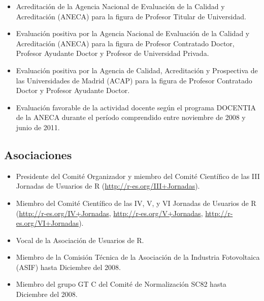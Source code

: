 \documentclass[article, a4paper]{memoir}
\begin{document}
\begin{itemize}
\item Acreditación de la Agencia Nacional de Evaluación de la Calidad y Acreditación (ANECA) para la figura de Profesor Titular de Universidad.

\item Evaluación positiva por la Agencia Nacional de Evaluación de la Calidad y Acreditación (ANECA) para la figura de Profesor Contratado Doctor, Profesor Ayudante Doctor y Profesor de Universidad Privada.

\item Evaluación positiva por la Agencia de Calidad, Acreditación y Prospectiva de las Universidades de Madrid (ACAP) para la figura de Profesor Contratado Doctor y Profesor Ayudante Doctor.

\item Evaluación favorable de la actividad docente según el programa DOCENTIA de la ANECA durante el período comprendido entre noviembre de 2008 y junio de 2011.
\end{itemize}

\subsection{Asociaciones}
\label{sec-12-4}

\begin{itemize}
\item Presidente del Comité Organizador y miembro del Comité Científico de las III Jornadas de Usuarios de R (\url{http://r-es.org/III+Jornadas}).

\item Miembro del Comité Científico de las IV, V, y VI Jornadas de Usuarios de R (\url{http://r-es.org/IV+Jornadas}, \url{http://r-es.org/V+Jornadas}, \url{http://r-es.org/VI+Jornadas}).

\item Vocal de la Asociación de Usuarios de R.

\item Miembro de la Comisión Técnica de la Asociación de la Industria Fotovoltaica (ASIF) hasta Diciembre del 2008.

\item Miembro del grupo GT C del Comité de Normalización SC82 hasta Diciembre del 2008.
\end{itemize}
\end{document}
